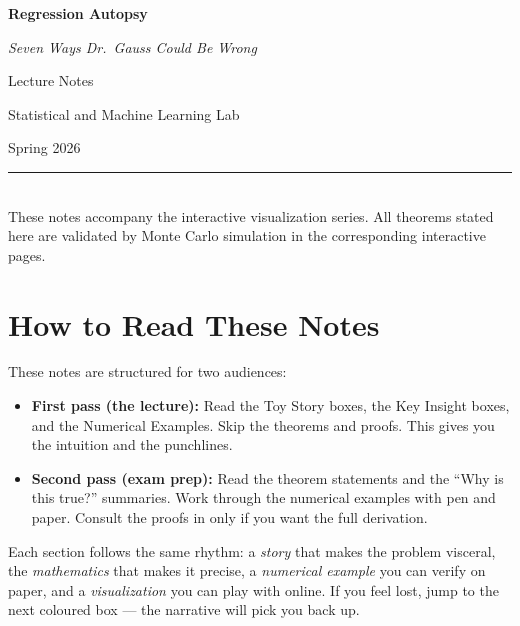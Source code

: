 \documentclass[11pt,a4paper]{article}
\theoremstyle{definition}
\theoremstyle{plain}
\theoremstyle{remark}
\begin{document}
\begin{titlepage}
\centering
\vspace*{3cm}
{\Huge\bfseries Regression Autopsy\par}
\vspace{0.5cm}
{\LARGE\color{olsblue!80!black}\itshape Seven Ways Dr.\ Gauss Could Be Wrong\par}
\vspace{2cm}
{\Large Lecture Notes\par}
\vspace{1cm}
{\large Statistical and Machine Learning Lab\par}
\vspace{0.5cm}
{\large Spring 2026\par}
\vfill
\rule{\textwidth}{0.4pt}\\[0.3cm]
{\small These notes accompany the interactive visualization series.
All theorems stated here are validated by Monte Carlo simulation in the corresponding interactive pages.}
\end{titlepage}

\tableofcontents
\newpage

\section*{How to Read These Notes}

These notes are structured for two audiences:

\begin{itemize}
  \item \textbf{First pass (the lecture):} Read the \colorbox{truthgold!15}{Toy Story} boxes, the \colorbox{olsblue!10}{Key Insight} boxes, and the \colorbox{olsblue!5}{Numerical Examples}. Skip the theorems and proofs. This gives you the intuition and the punchlines.

  \item \textbf{Second pass (exam prep):} Read the theorem statements and the ``Why is this true?'' summaries. Work through the numerical examples with pen and paper. Consult the proofs in  only if you want the full derivation.
\end{itemize}

Each section follows the same rhythm: a \emph{story} that makes the problem visceral, the \emph{mathematics} that makes it precise, a \emph{numerical example} you can verify on paper, and a \emph{visualization} you can play with online. If you feel lost, jump to the next coloured box --- the narrative will pick you back up.
\end{document}
